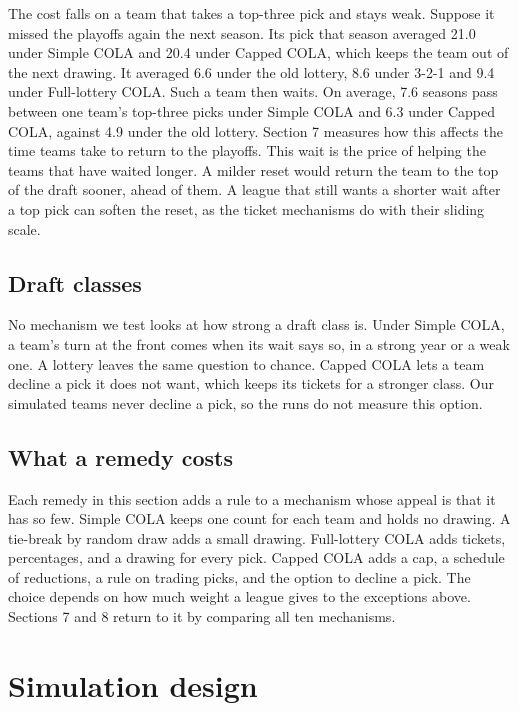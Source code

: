 \documentclass[11pt,letterpaper]{article}
\begin{document}
The cost falls on a team that takes a top-three pick and stays weak. Suppose it missed the playoffs again the next season. Its pick that season averaged 21.0 under Simple COLA and 20.4 under Capped COLA, which keeps the team out of the next drawing. It averaged 6.6 under the old lottery, 8.6 under 3-2-1 and 9.4 under Full-lottery COLA. Such a team then waits. On average, 7.6 seasons pass between one team's top-three picks under Simple COLA and 6.3 under Capped COLA, against 4.9 under the old lottery. Section 7 measures how this affects the time teams take to return to the playoffs. This wait is the price of helping the teams that have waited longer. A milder reset would return the team to the top of the draft sooner, ahead of them. A league that still wants a shorter wait after a top pick can soften the reset, as the ticket mechanisms do with their sliding scale.

 \subsection{Draft classes}

No mechanism we test looks at how strong a draft class is. Under Simple COLA, a team's turn at the front comes when its wait says so, in a strong year or a weak one. A lottery leaves the same question to chance. Capped COLA lets a team decline a pick it does not want, which keeps its tickets for a stronger class. Our simulated teams never decline a pick, so the runs do not measure this option.

\subsection{What a remedy costs}

Each remedy in this section adds a rule to a mechanism whose appeal is that it has so few. Simple COLA keeps one count for each team and holds no drawing. A tie-break by random draw adds a small drawing. Full-lottery COLA adds tickets, percentages, and a drawing for every pick. Capped COLA adds a cap, a schedule of reductions, a rule on trading picks, and the option to decline a pick. The choice depends on how much weight a league gives to the exceptions above. Sections 7 and 8 return to it by comparing all ten mechanisms.

\section{Simulation design}
\end{document}
